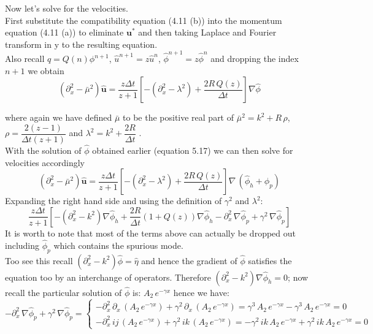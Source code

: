 Now let's solve for the velocities.\\
First substitute the compatibility equation (4.11 (b)) into the momentum equation (4.11 (a)) to eliminate $\textbf{u}^*$ and then taking Laplace and Fourier transform in y to the resulting equation.\\
Also recall $q = Q(n)\phi^{n+1}$, $\hat{u}^{n+1} = z \hat{u}^n$, $\hat{\phi}^{n+1} = z \hat{\phi}^n$ and dropping the index $n+1$ we obtain \\

\begin{equation}
(\partial_x^2 - \bar{\mu}^2) \hat{\textbf{u}} = \dfrac{z \Delta t}{z + 1} [- (\partial_x^2 - \lambda^2) + \dfrac{2 R \, Q(z)}{\Delta t}] \nabla \hat{\phi}
\end{equation}

where again we have defined $\bar{\mu}$ to be the positive real part of $\bar{\mu}^2 = k^2 + R \, \rho$, $\rho = \dfrac{2(z - 1)}{\Delta t (z + 1)}$ and $\lambda^2 = k^2 + \dfrac{2 R}{\Delta t}$ \cite{brown2001accurate}.\\

With the solution of $\hat{\phi}$ obtained earlier (equation 5.17) we can then solve for velocities accordingly
\begin{equation}
(\partial_x^2 - \bar{\mu}^2) \hat{\textbf{u}} = \dfrac{z \Delta t}{z + 1} [- (\partial_x^2 - \lambda^2) + \dfrac{2 R \, Q(z)}{\Delta t}] \nabla \,(\hat{\phi}_h + \hat{\phi}_p)
\end{equation}
Expanding the right hand side and using the definition of $\gamma^2$ and $\lambda^2$:
\begin{equation*}
\dfrac{z \Delta t}{z + 1} [- (\partial_x^2 - k^2) \nabla \hat{\phi}_h + \dfrac{2R}{\Delta t}(1+Q(z)) \nabla \hat{\phi}_h - \partial_x^2\,\nabla \hat{\phi}_p + \gamma^2\,\nabla \hat{\phi}_p] 
\end{equation*}
It is worth to note that most of the terms above can actually be dropped out including $\hat{\phi}_p$ which contains the spurious mode.\\
Too see this recall $(\partial_x^2 - k^2)\hat{\phi} = \hat{\eta}$ and hence the gradient of $\hat{\phi}$ satisfies the equation too by an interchange of operators. Therefore $(\partial_x^2 - k^2) \nabla \hat{\phi}_h =0$; now recall the particular solution of $\hat{\phi}$ is: $A_2 \,e^{-\gamma x}$ hence we have:
\begin{equation*}
- \partial_x^2\,\nabla \hat{\phi}_p + \gamma^2\,\nabla \hat{\phi}_p = 
\begin{cases}
-\partial_x^2\,\partial_x \,(A_2 \,e^{-\gamma x}) + \gamma^2\,\partial_x\,(A_2 \,e^{-\gamma x})
= \gamma^3\,A_2 \,e^{-\gamma x} - \gamma^3\,A_2 \,e^{-\gamma x} = 0\\
-\partial_x^2\,ij \,(A_2 \,e^{-\gamma x}) + \gamma^2\,ik\,(A_2 \,e^{-\gamma x})
= -\gamma^2 \,ik\,A_2 \,e^{-\gamma x} + \gamma^2\,ik\,A_2 \,e^{-\gamma x} = 0
\end{cases}
\end{equation*}

